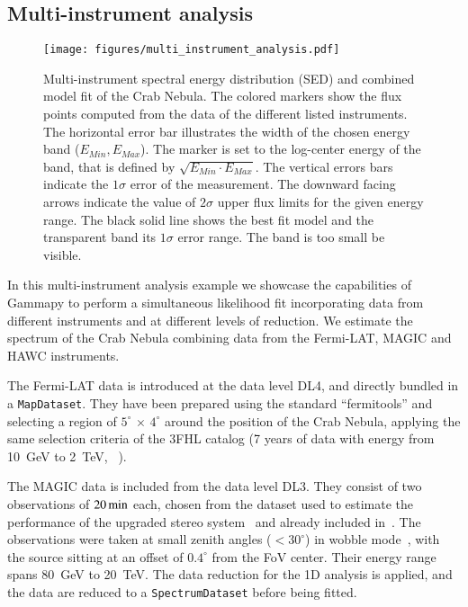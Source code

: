 \documentclass[longauth]{aa}
\newcommand{\code}[1]{\texttt{#1}}
\newcommand{\gammapy}{Gammapy\xspace}
\newcommand{\hawc}{HAWC\xspace}
\newcommand{\magic}{MAGIC\xspace}
\newcommand{\fermi}{Fermi-LAT\xspace}
\begin{document}
\subsection{Multi-instrument analysis}
\label{ssec:multi-instrument-analysis}
%
\begin{figure*}[t]
        \sidecaption
        \texttt{[image: figures/multi\_instrument\_analysis.pdf]}
        \caption{
        Multi-instrument spectral energy distribution (SED) and combined model fit
        of the Crab Nebula. The  colored markers show the flux points computed from
        the data of the different listed instruments. The horizontal error bar
        illustrates the width of the chosen energy band ($E_{Min}, E_{Max}$).
        The marker is set to the log-center energy of the band, that is
        defined by $\sqrt{E_{Min} \cdot E_{Max}}$. The vertical errors bars
        indicate the $1\sigma$ error of the measurement. The downward
        facing arrows indicate the value of $2\sigma$ upper flux limits
        for the given energy range. The black solid line shows the best
        fit model and the transparent band its $1\sigma$ error range.
                The band is too small be visible.
    }
        \label{fig:multi_instrument_analysis}
\end{figure*}
%
In this multi-instrument analysis example we showcase the capabilities of
\gammapy to perform a simultaneous likelihood fit incorporating data from
different instruments and at different levels of reduction. We estimate the
spectrum of the Crab Nebula combining data from the \fermi, \magic and \hawc
instruments.

The \fermi data is introduced at the data level DL4, and directly bundled in a
\code{MapDataset}. They have been prepared using the standard \enquote{fermitools} \citep{Fermitools2019} and
selecting a region of $5^{\circ}\,\times\,4^{\circ}$ around the
position of the Crab Nebula, applying the same selection criteria of the 3FHL
catalog (7 years of data with energy from \SI{10}{GeV} to \SI{2}{TeV},
~\citealt{3FHL}).

The \magic data is included from the data level DL3. They consist of two
observations of $20\,{\rm min}$ each, chosen from the dataset used to estimate
the performance of the upgraded stereo system~\citep{magic_performance} and
already included in~\cite{joint_crab}. The observations were taken at small
zenith angles ($<30^{\circ}$) in wobble mode~\citep{fomin_1994}, with the
source sitting at an offset of $0.4^{\circ}$ from the FoV center. Their energy
range spans \SI{80}{GeV} to \SI{20}{TeV}. The data reduction for the 1D analysis
is applied, and the data are reduced to a \code{SpectrumDataset} before being fitted.
\end{document}
